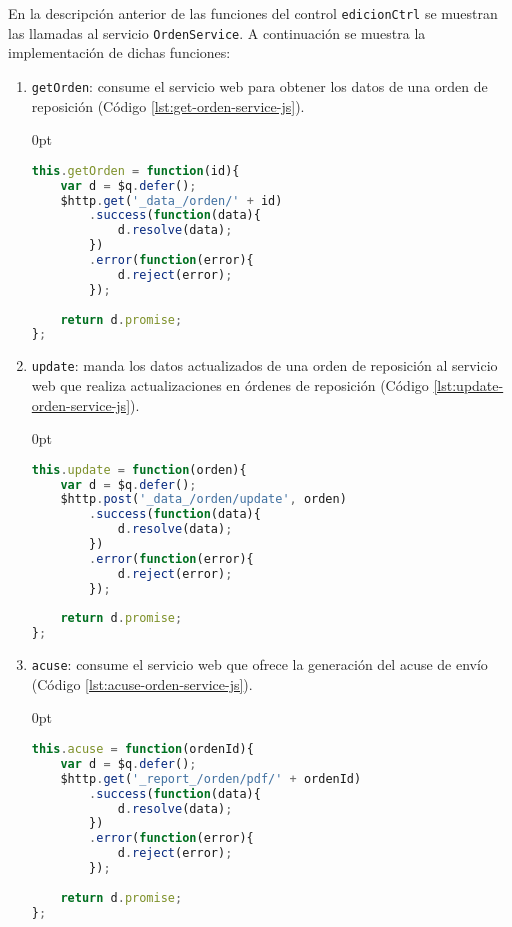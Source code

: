 \begin{enumerate}
\begin{enumerate}
\end{enumerate}

En la descripción anterior de las funciones del control \texttt{edicionCtrl} se muestran las llamadas al servicio \texttt{OrdenService}. A continuación se muestra la implementación de dichas funciones:

\begin{enumerate}
	\item \texttt{getOrden}: consume el servicio web para obtener los datos de una orden de reposición (Código \ref{lst:get-orden-service-js}).
\begin{adjustwidth}{\listingfixlargewidth}{0pt}
\begin{lstlisting}[language=Javascript, caption={Función para consumir el servicio web que obtiene los datos de una orden de reposición.}, captionpos=b, label={lst:get-orden-service-js}]
this.getOrden = function(id){
	var d = $q.defer();
	$http.get('_data_/orden/' + id)
		.success(function(data){
			d.resolve(data);
		})
		.error(function(error){
			d.reject(error);
		});
	
	return d.promise;
};
\end{lstlisting}
\end{adjustwidth}

	\item \texttt{update}: manda los datos actualizados de una orden de reposición al servicio web que realiza actualizaciones en órdenes de reposición (Código \ref{lst:update-orden-service-js}).
\begin{adjustwidth}{\listingfixlargewidth}{0pt}
\begin{lstlisting}[language=Javascript, caption={Función para actualizar los datos de una orden de reposición.}, captionpos=b, label={lst:update-orden-service-js}]
this.update = function(orden){
	var d = $q.defer();
	$http.post('_data_/orden/update', orden)
		.success(function(data){
			d.resolve(data);
		})
		.error(function(error){
			d.reject(error);
		});
	
	return d.promise;
};
\end{lstlisting}
\end{adjustwidth}

	\item \texttt{acuse}: consume el servicio web que ofrece la generación del acuse de envío (Código \ref{lst:acuse-orden-service-js}).
\begin{adjustwidth}{\listingfixlargewidth}{0pt}
\begin{lstlisting}[language=Javascript, caption={Función para mandar la generación del acuse de envío de una orden de reposición.}, captionpos=b, label={lst:acuse-orden-service-js}]
this.acuse = function(ordenId){
	var d = $q.defer();
	$http.get('_report_/orden/pdf/' + ordenId)
		.success(function(data){
			d.resolve(data);
		})
		.error(function(error){
			d.reject(error);
		});
	
	return d.promise;
};
\end{lstlisting}
\end{adjustwidth}

\end{enumerate}
\end{enumerate}

